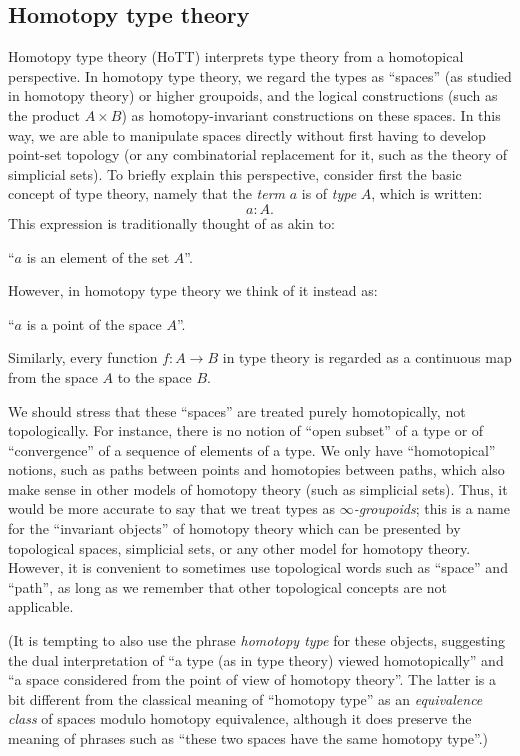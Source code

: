\subsection*{Homotopy type theory}

Homotopy type theory (HoTT) interprets type theory from a homotopical perspective.
In homotopy type theory, we regard the types as ``spaces'' (as studied in homotopy theory) or higher groupoids, and the logical constructions (such as the product $A\times B$) as homotopy-invariant constructions on these spaces.
In this way, we are able to manipulate spaces directly without first having to develop point-set topology (or any combinatorial replacement for it, such as the theory of simplicial sets).
To briefly explain this perspective, consider first the basic concept of type theory, namely that
the \emph{term} $a$ is of \emph{type} $A$, which is written:
\[ a:A. \]
This expression is traditionally thought of as akin to:
\begin{center}
``$a$ is an element of the set $A$''.
\end{center}
However, in homotopy type theory we think of it instead as:
\begin{center}
``$a$ is a point of the space $A$''.
\end{center}
%
Similarly, every function $f : A\to B$ in type theory is regarded as a continuous map from the space $A$ to the space $B$.

We should stress that these ``spaces'' are treated purely homotopically, not topologically.
For instance, there is no notion of ``open subset'' of a type or of ``convergence'' of a sequence of elements of a type.
We only have ``homotopical'' notions, such as paths between points and homotopies between paths, which also make sense in other models of homotopy theory (such as simplicial sets).
Thus, it would be more accurate to say that we treat types as \emph{$\infty$-groupoids}; this is a name for the ``invariant objects'' of homotopy theory which can be presented by topological spaces,
%
simplicial sets, or any other model for homotopy theory.
However, it is convenient to sometimes use topological words such as ``space'' and ``path'', as long as we remember that other topological concepts are not applicable.

(It is tempting to also use the phrase \emph{homotopy type}
%
for these objects, suggesting the dual interpretation of ``a type (as in type theory) viewed homotopically'' and ``a space considered from the point of view of homotopy theory''.
The latter is a bit different from the classical meaning of ``homotopy type'' as an \emph{equivalence class} of spaces modulo homotopy equivalence, although it does preserve the meaning of phrases such as ``these two spaces have the same homotopy type''.)

